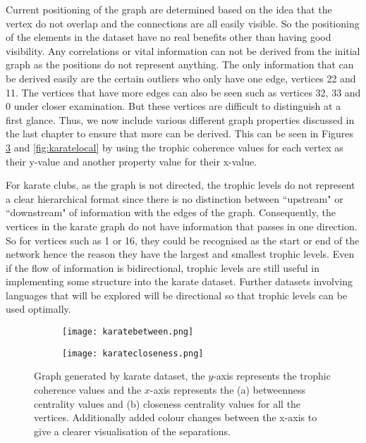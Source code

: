 Current positioning of the graph are determined based on the idea that the vertex do not overlap and the connections are all easily visible. So the positioning of the elements in the dataset have no real benefits other than having good visibility. Any correlations or vital information can not be derived from the initial graph as the positions do not represent anything. The only information that can be derived easily are the certain outliers who only have one edge, vertices 22 and 11. The vertices that have more edges can also be seen such as vertices 32, 33 and 0 under closer examination. But these vertices are difficult to distinguish at a first glance. Thus, we now include various different graph properties discussed in the last chapter to ensure that more can be derived. This can be seen in Figures \ref{fig:karatecentrality} and \ref{fig:karatelocal} by using the trophic coherence values for each vertex as their y-value and another property value for their x-value.

For karate clubs, as the graph is not directed, the trophic levels do not represent a clear hierarchical format since there is no distinction between ``upstream" or ``downstream" of information with the edges of the graph. Consequently, the vertices in the karate graph do not have information that passes in one direction. So for vertices such as 1 or 16, they could be recognised as the start or end of the network hence the reason they have the largest and smallest trophic levels. Even if the flow of information is bidirectional, trophic levels are still useful in implementing some structure into the karate dataset. Further datasets involving languages that will be explored will be directional so that trophic levels can be used optimally.

\begin{figure}[H]
\centering
\begin{subfigure}{.45\textwidth}
	\texttt{[image: karatebetween.png]}
	\caption{}
	\label{fig:karatea}
\end{subfigure}
\hfill
\begin{subfigure}{.45\textwidth}
	\texttt{[image: karatecloseness.png]}
	\caption{}
	\label{fig:karateb}
\end{subfigure}
\caption{Graph generated by karate dataset, the $y$-axis represents the trophic coherence values and the $x$-axis represents the (a) betweenness centrality values and (b) closeness centrality values for all the vertices. Additionally added colour changes between the x-axis to give a clearer visualisation of the separations.}
\label{fig:karatecentrality}
\end{figure}

